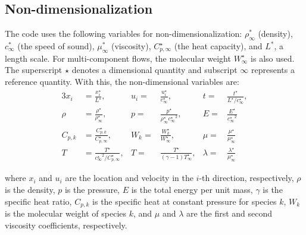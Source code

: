 \documentclass[12pt]{article}
\begin{document}
\subsection{Non-dimensionalization \label{sec:nondimensional}}
The code uses the following variables for non-dimensionalization: $\rho_\infty^*$ (density), $c_\infty^*$ (the speed of sound), $\mu_\infty^*$ (viscosity), $C_{p,\infty}^{\star}$ (the heat capacity), and $L^*$, a length scale. For multi-component flows, the molecular weight $W_\infty^\star$ is also used. The superscript $\star$ denotes a dimensional quantity and subscript $\infty$ represents a reference quantity. With this, the non-dimensional variables are:
\begin{alignat*}{3}
x_i &= \frac{x_i^{\star}}{L^{\star}}, &{}u_i ={}& \frac{u_i^{\star}}{c_{\infty}^{\star}},  &t=& \frac{t^{\star}}{L^{\star}/c_{\infty}^{\star}},  \\
\rho &= \frac{\rho^{\star}}{\rho_{\infty}^{\star}},   &{}p={}& \frac{p^{\star}}{\rho_{\infty}^{\star} {c_{\infty}^{\star}}^2 }, &{}E={}&\frac{E^{\star}}{ {c_{\infty}^{\star}}^2 } \\
C_{p,k} &=  \frac{C_{p,k}^{\star}}{C_{p,\infty}^{\star}}, &{}W_k ={}& \frac{W_{k}^{\star}}{W_{\infty}^{\star}}, &\mu = &\frac{\mu^{\star}}{\mu_{\infty}^{\star}} \\
T &= \frac{T^{\star}}{{c_{\infty}^{\star}}^2 / C_{p,\infty}^{\star}}, &{}T={}&\frac{T^{\star}}{(\gamma-1)T_{\infty}^{\star}}, &{}\lambda ={}& \frac{\lambda^{\star}}{\mu_{\infty}^{\star}}
\end{alignat*}

where $x_i$ and $u_i$ are the location and velocity in the $i$-th direction, respectively, $\rho$ is the density, $p$ is the pressure, $E$ is the total energy per unit mass, $\gamma$ is the specific heat ratio, $C_{p,k}$ is the specific heat at constant pressure for species $k$, $W_k$ is the molecular weight of species $k$, and $\mu$ and $\lambda$ are the first and second viscosity coefficients, respectively.
\end{document}
